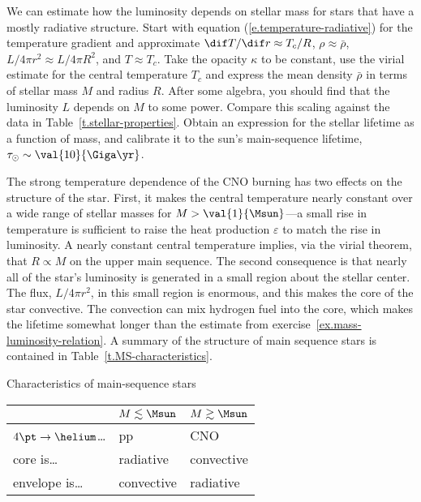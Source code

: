 \begin{exercisebox}
\label{ex.mass-luminosity-relation}
We can estimate how the luminosity depends on stellar mass for stars that have a mostly radiative structure. Start with equation (\ref{e.temperature-radiative}) for the temperature gradient and approximate $\dif T/\dif r \approx T_{c}/R$, $\rho \approx \bar{\rho}$, $L/4\pi r^{2} \approx L/4\pi R^{2}$, and $T\approx T_{c}$. Take the opacity $\kappa$ to be constant,  use the virial estimate for the central temperature $T_{c}$ and express the mean density $\bar{\rho}$ in terms of stellar mass $M$ and radius $R$. After some algebra, you should find that the luminosity $L$ depends on $M$ to some power. Compare this scaling against the data in Table~\ref{t.stellar-properties}. Obtain an expression for the stellar lifetime as a function of mass, and calibrate it to the sun's main-sequence lifetime, $\tau_{\odot}\sim\val{10}{\Giga\yr}$.
\end{exercisebox}

 The strong temperature dependence of the CNO burning has two effects on the structure of the star. First, it makes the central temperature nearly constant over a wide range of stellar masses for $M>\val{1}{\Msun}$---a small rise in temperature is sufficient to raise the heat production $\varepsilon$ to match the rise in luminosity. A nearly constant central temperature implies, via the virial theorem, that $R \propto M$ on the upper main sequence. The second consequence is that nearly all of the star's luminosity is generated in a small region about the stellar center. The flux, $L/4\pi r^{2}$, in this small region is enormous, and this makes the core of the star convective. The convection can mix hydrogen fuel into the core, which makes the lifetime somewhat longer than the estimate from exercise~\ref{ex.mass-luminosity-relation}. A summary of the structure of main sequence stars is contained in Table~\ref{t.MS-characteristics}.
\begin{margintable}
\caption{\label{t.MS-characteristics} Characteristics of main-sequence stars}
\centering
\begin{tabular}{lll}
 & $M\lesssim\Msun$ & $M\gtrsim\Msun$\\
\hline
$4\pt\to\helium$\ldots & pp & CNO\\
core is\ldots & radiative  & convective\\
envelope is\ldots & convective & radiative\\
\end{tabular}
\end{margintable}


